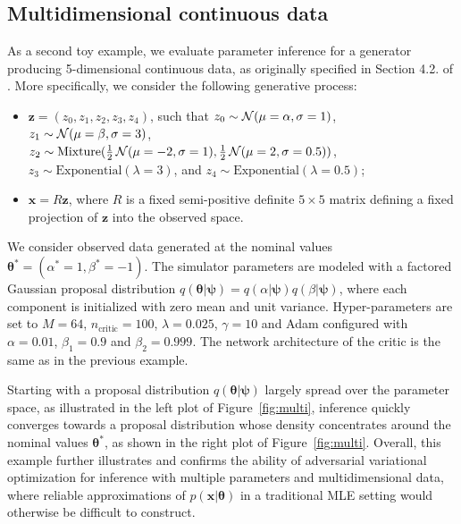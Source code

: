 \documentclass[twocolumn,superscriptaddress,aps]{revtex4-1}
\newcommand{\bftheta}{{\bm \theta}}
\newcommand{\bfpsi}{{\bm \psi}}
\newcommand{\bfz}{\mathbf{z}}
\theoremstyle{plain}
\begin{document}
\subsection{Multidimensional continuous data}

As a second toy example, we evaluate parameter inference for a generator producing
5-dimensional continuous data, as originally specified in Section 4.2. of
\citep{cranmer2015approximating}. More specifically, we consider the following
generative process:
\begin{itemize}
    \item $\bfz = (z_0, z_1, z_2, z_3, z_4)$, such that
        $z_0 \sim {\cal N}(\mu=\alpha, \sigma=1)$,
        $z_1 \sim {\cal N}(\mu=\beta, \sigma=3)$,
        $z_2 \sim {\text{Mixture}}(\frac{1}{2}\,{\cal N}(\mu=-2, \sigma=1), \frac{1}{2}\,{\cal N}(\mu=2, \sigma=0.5))$,
        $z_3 \sim {\text{Exponential}(\lambda=3)}$, and
        $z_4 \sim {\text{Exponential}(\lambda=0.5)}$;
    \item $\mathbf{x} = R  \bfz$, where $R$ is a fixed
    semi-positive definite $5 \times 5$ matrix defining a fixed projection
    of $\bfz$ into the observed space.
\end{itemize}
We consider observed data generated at the nominal values $\bftheta^* = (\alpha^*=1,\beta^*=-1)$.
The simulator parameters are modeled with a factored Gaussian
proposal distribution $q(\bftheta|\bfpsi) = q(\alpha|\bfpsi) q(\beta|\bfpsi)$, where each component is
initialized with zero mean and unit variance.
Hyper-parameters are set to $M=64$, $n_\text{critic}=100$, $\lambda=0.025$, $\gamma=10$ and
Adam configured with $\alpha=0.01$, $\beta_1=0.9$ and $\beta_2=0.999$.
The network architecture of the critic is the same as in the previous example.

Starting with a proposal distribution $q(\bftheta|\bfpsi)$ largely spread over
the parameter space, as illustrated in the left plot of Figure~\ref{fig:multi},
inference quickly converges towards a proposal distribution whose density
concentrates around the nominal values $\bftheta^*$, as shown in the right plot of Figure~\ref{fig:multi}.
Overall, this example further illustrates and confirms the ability of adversarial
variational optimization for inference with multiple parameters and multidimensional
data, where reliable approximations of $p(\mathbf{x}|\bftheta)$ in a traditional
MLE setting would otherwise be difficult to construct.
\end{document}
